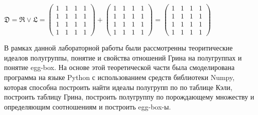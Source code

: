 \documentclass[spec, och, labwork]{shiza}
\begin{document}
      $\mathfrak{D} = \mathfrak{R} \vee \mathfrak{L} =
      \begin{pmatrix}
        1 & 1 & 1 & 1 \\
        1 & 1 & 1 & 1 \\
        1 & 1 & 1 & 1 \\
        1 & 1 & 1 & 1
      \end{pmatrix} +
      \begin{pmatrix}
        1 & 1 & 1 & 1 \\
        1 & 1 & 1 & 1 \\
        1 & 1 & 1 & 1 \\
        1 & 1 & 1 & 1
      \end{pmatrix} =
      \begin{pmatrix}
        1 & 1 & 1 & 1 \\
        1 & 1 & 1 & 1 \\
        1 & 1 & 1 & 1 \\
        1 & 1 & 1 & 1
      \end{pmatrix}$


\conclusion

В рамках данной лабораторной работы были рассмотренны теоритические идеалов полугруппы, понятие и свойства отношений Грина на полугруппах и понятие egg-box. 
На основе этой теоретической части была смоделирована программа на языке Python с 
использованием средств библиотеки Numpy, которая способна построить найти идеалы полугрупп по по таблице Кэли, построить таблицу Грина,
построить полугруппу по порождающему множеству и определяющим соотношениям и построить egg-box-ы.
\end{document}
